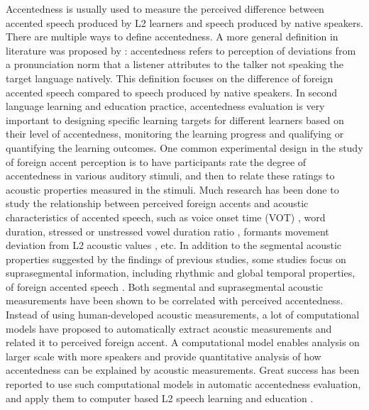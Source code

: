 Accentedness is usually used to measure the perceived difference between accented speech produced by L2 learners and speech produced by native speakers. There are multiple ways to define accentedness. A more general definition in literature was proposed by \cite{mccullough2013acoustic}: accentedness refers to perception of deviations from a pronunciation norm that a listener attributes to the talker not speaking the target language natively. This definition focuses on the difference of foreign accented speech compared to speech produced by native speakers. In second language learning and education practice, accentedness evaluation is very important to designing specific learning targets for different learners based on their level of accentedness, monitoring the learning progress and qualifying or quantifying the learning outcomes. One common experimental design in the study of foreign accent perception is to have participants rate the degree of accentedness in various auditory stimuli, and then to relate these ratings to acoustic properties measured in the stimuli. Much research has been done to study the relationship between perceived foreign accents and acoustic characteristics of accented speech, such as voice onset time (VOT) \citep{major1987english}, word duration, stressed or unstressed vowel duration ratio \citep{shah2002temporal}, formants movement deviation from L2 acoustic values \citep{munro1993productions}, etc. In addition to the segmental acoustic properties suggested by the findings of previous studies, some studies focus on suprasegmental information, including rhythmic and global temporal properties, of foreign accented speech \citep{munro2010detection,kang2010relative}. Both segmental and suprasegmental acoustic measurements have been shown to be correlated with perceived accentedness. Instead of using human-developed acoustic measurements, a lot of computational models have proposed to automatically extract acoustic measurements and related it to perceived foreign accent. A computational model enables analysis on larger scale with more speakers and provide quantitative analysis of how accentedness can be explained by acoustic measurements. Great success has been reported to use such computational models in automatic accentedness evaluation, and apply them to computer based L2 speech learning and education \citep{franco1997automatic,sangwan2012automatic,william2013automatic,chen2015automatic,tao2016exploring,qian2017bidirectional}.


